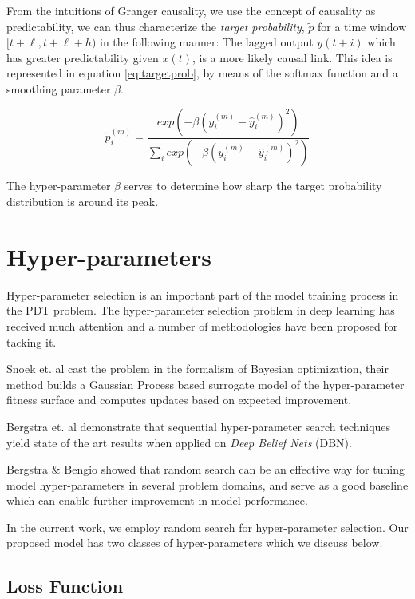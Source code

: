 \documentclass[envcountsect,runningheads]{llncs}
\theoremstyle{etoile}
\begin{document}
From the intuitions of Granger causality, we use the concept of causality as predictability, 
we can thus characterize the \emph{target probability}, $\widetilde{p}$ for a time window 
$[t+\ell, t+\ell+h)$ in the following manner: The lagged output $y(t+i)$ which has greater 
predictability given $x(t)$, is a more likely causal link. This idea is represented in 
equation \ref{eq:targetprob}, by means of the softmax function and a smoothing parameter 
$\beta$.

\begin{equation}\label{eq:targetprob}
\widetilde{p}_{i}^{(m)} = \frac{exp \left(- \beta (y_{i}^{(m)} - \hat{y}_{i}^{(m)})^{2} \right)}
{\sum_{i}{exp \left(- \beta (y_{i}^{(m)} - \hat{y}_{i}^{(m)})^{2} \right)}} 
\end{equation}

The hyper-parameter $\beta$ serves to determine how sharp the target probability distribution is 
around its peak.


\section{Hyper-parameters}

Hyper-parameter selection is an important part of the model training process in the PDT problem. 
The hyper-parameter selection problem in deep learning has received much attention and a number 
of methodologies have been proposed for tacking it. 

Snoek et. al \cite{snoek2012practical} cast the problem in the formalism of Bayesian optimization, their method 
builds a Gaussian Process based surrogate model of the hyper-parameter fitness surface and computes 
updates based on expected improvement. 


Bergstra et. al \cite{hypBengio} demonstrate that sequential hyper-parameter search techniques yield state of the art 
results when applied on \emph{Deep Belief Nets} (DBN). 

Bergstra \& Bengio \cite{randomsearchBengio} showed that random search can be an effective way for tuning model 
hyper-parameters in several problem domains, and serve as a good baseline which can enable 
further improvement in model performance.

In the current work, we employ random search for hyper-parameter selection. 
Our proposed model has two classes of hyper-parameters which we discuss below.

\subsection{Loss Function}
\end{document}
